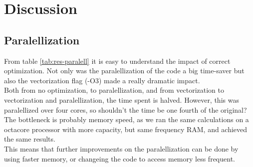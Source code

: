 \documentclass[../main.tex]{subfiles}
\begin{document}
\section{Discussion}
\subsection{Paralellization}
From table \ref{tab:res-paralell} it is easy to understand the impact of correct optimization. Not only was the paralellization of the code a big time-saver but also the vectorization flag (-O3) made a really dramatic impact.\\

Both from no optimization, to paralellization, and from vectorization to vectorization and paralellization, the time spent is halved. However, this was paralellized over four cores, so shouldn't the time be one fourth of the original? The bottleneck is probably memory speed, as we ran the same calculations on a octacore processor with more capacity, but same frequency RAM, and achieved the same results.\\

This means that further improvements on the paralellization can be done by using faster memory, or changeing the code to access memory less frequent.
\end{document}
